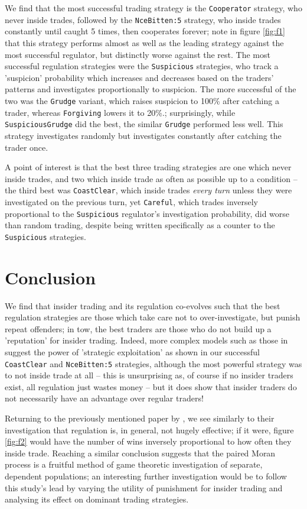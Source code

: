 \documentclass{article}
\begin{document}
We find that the most successful trading strategy is the \texttt{Cooperator} strategy, who never inside trades, followed by the \texttt{NceBitten:5} strategy, who inside trades constantly until caught 5 times, then cooperates forever; note in figure \ref{fig:f1} that this strategy performs almost as well as the leading strategy against the most successful regulator, but distinctly worse against the rest. The most successful regulation strategies were the \texttt{Suspicious} strategies, who track a 'suspicion' probability which increases and decreases based on the traders' patterns and investigates proportionally to suspicion. The more successful of the two was the \texttt{Grudge} variant, which raises suspicion to 100\% after catching a trader, whereas \texttt{Forgiving} lowers it to 20\%.; surprisingly, while \texttt{SuspiciousGrudge} did the best, the similar \texttt{Grudge} performed less well. This strategy investigates randomly but investigates constantly after catching the trader once.

A point of interest is that the best three trading strategies are one which never inside trades, and two which inside trade as often as possible up to a condition -- the third best was \texttt{CoastClear}, which inside trades \emph{every turn} unless they were investigated on the previous turn, yet \texttt{Careful}, which trades inversely proportional to the \texttt{Suspicious} regulator's investigation probability, did worse than random trading, despite being written specifically as a counter to the \texttt{Suspicious} strategies.

\section{Conclusion}
We find that insider trading and its regulation co-evolves such that the best regulation strategies are those which take care not to over-investigate, but punish repeat offenders; in tow, the best traders are those who do not build up a 'reputation' for insider trading. Indeed, more complex models such as those in \textcite{kyle1985continuous} suggest the power of 'strategic exploitation' as shown in our successful \texttt{CoastClear} and \texttt{NceBitten:5} strategies, although the most powerful strategy was to not inside trade at all -- this is unsurprising as, of course if no insider traders exist, all regulation just wastes money -- but it does show that insider traders do not necessarily have an advantage over regular traders!

Returning to the previously mentioned paper by \textcite{smales2017game}, we see similarly to their investigation that regulation is, in general, not hugely effective; if it were, figure \ref{fig:f2} would have the number of wins inversely proportional to how often they inside trade. Reaching a similar conclusion suggests that the paired Moran process is a fruitful method of game theoretic investigation of separate, dependent populations; an interesting further investigation would be to follow this study's lead by varying the utility of punishment for insider trading and analysing its effect on dominant trading strategies.
\begingroup
\setlength\bibitemsep{0pt}
\printbibliography
\endgroup
\end{document}

